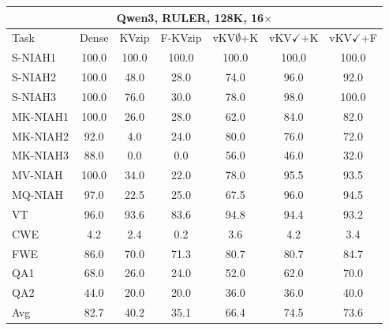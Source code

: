 \begin{tabular}{lcccccc}
\toprule
\multicolumn{7}{c}{Qwen3, RULER, 128K, 16$\times$} \\
\midrule
Task & Dense & KVzip & F-KVzip & vKV$\emptyset$+K & vKV$\checkmark$+K & vKV$\checkmark$+F \\
\midrule
S-NIAH1 & 100.0 & 100.0 & 100.0 & 100.0 & 100.0 & 100.0 \\
S-NIAH2 & 100.0 & 48.0 & 28.0 & 74.0 & 96.0 & 92.0 \\
S-NIAH3 & 100.0 & 76.0 & 30.0 & 78.0 & 98.0 & 100.0 \\
MK-NIAH1 & 100.0 & 26.0 & 28.0 & 62.0 & 84.0 & 82.0 \\
MK-NIAH2 & 92.0 & 4.0 & 24.0 & 80.0 & 76.0 & 72.0 \\
MK-NIAH3 & 88.0 & 0.0 & 0.0 & 56.0 & 46.0 & 32.0 \\
MV-NIAH & 100.0 & 34.0 & 22.0 & 78.0 & 95.5 & 93.5 \\
MQ-NIAH & 97.0 & 22.5 & 25.0 & 67.5 & 96.0 & 94.5 \\
VT & 96.0 & 93.6 & 83.6 & 94.8 & 94.4 & 93.2 \\
CWE & 4.2 & 2.4 & 0.2 & 3.6 & 4.2 & 3.4 \\
FWE & 86.0 & 70.0 & 71.3 & 80.7 & 80.7 & 84.7 \\
QA1 & 68.0 & 26.0 & 24.0 & 52.0 & 62.0 & 70.0 \\
QA2 & 44.0 & 20.0 & 20.0 & 36.0 & 36.0 & 40.0 \\
\midrule
Avg & 82.7 & 40.2 & 35.1 & 66.4 & 74.5 & 73.6 \\
\bottomrule
\end{tabular}
\vspace{0.8em}

